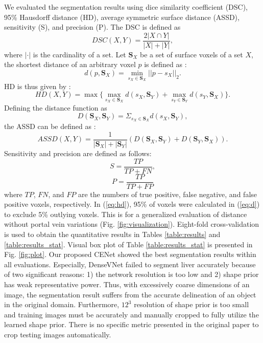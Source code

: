 \documentclass[journal]{IEEEtran}
\begin{document}
We evaluated the segmentation results using dice similarity coefficient (DSC), 95\% Hausdorff distance (HD), average symmetric surface distance (ASSD), sensitivity (S), and precision (P). The DSC is defined as
\begin{equation}
    DSC(X,Y)=\frac{2|X \cap Y|}{|X|+|Y|},
\end{equation}
\noindent
where \(|\cdot|\) is the cardinality of a set. Let \(\textbf{S}_X\) be a set of surface voxels of a set \(X\), the shortest distance of an arbitrary voxel \(p\) is defined as \cite{heimann2009comparison}:
\begin{equation}
    d(p, \textbf{S}_X)=\min_{s_X \in \textbf{S}_X}{||p-s_X||}_2.
\label{eq:d}
\end{equation}
\noindent
HD is thus given by \cite{heimann2009comparison}:
\begin{equation}
    HD(X,Y)=\max\{\max_{s_X \in \textbf{S}_X}{d(s_X, \textbf{S}_Y)}+\max_{s_Y \in \textbf{S}_Y}{d(s_Y, \textbf{S}_X)}\}.
\label{eq:hd}
\end{equation}
\noindent
Defining the distance function as
\begin{equation}
    D(\textbf{S}_X, \textbf{S}_Y)=\Sigma_{s_X \in \textbf{S}_X} d(s_X, \textbf{S}_Y),
\end{equation}
the ASSD can be defined as \cite{heimann2009comparison}:
\begin{equation}
    ASSD(X,Y)=\frac{1}{|\textbf{S}_X|+|\textbf{S}_Y|}(D(\textbf{S}_X, \textbf{S}_Y)+D(\textbf{S}_Y, \textbf{S}_X)).
\end{equation}
Sensitivity and precision are defined as follows:
\begin{equation}
    S=\frac{TP}{TP+FN},
\label{eq:sensitivity}
\end{equation}
\begin{equation}
    P=\frac{TP}{TP+FP}
\label{eq:precision}
\end{equation}
\noindent
where \(TP\), \(FN\), and \(FP\) are the numbers of true positive, false negative, and false positive voxels, respectively. In (\ref{eq:hd}), 95\% of voxels were calculated in (\ref{eq:d}) to exclude 5\% outlying voxels. This is for a generalized evaluation of distance without portal vein variations (Fig. \ref{fig:visualization}). Eight-fold cross-validation is used to obtain the quantitative results in Tables \ref{table:results} and \ref{table:results_stat}. Visual box plot of Table \ref{table:results_stat} is presented in Fig. \ref{fig:plot}. Our proposed CENet showed the best segmentation results within all evaluations. Especially, DenseVNet failed to segment liver accurately because of two significant reasons: 1) the network resolution is too low and 2) shape prior has weak representative power. Thus, with excessively coarse dimensions of an image, the segmentation result suffers from the accurate delineation of an object in the original domain. Furthermore, \(12^3\) resolution of shape prior is too small and training images must be accurately and manually cropped to fully utilize the learned shape prior. There is no specific metric presented in the original paper \cite{gibson2018automatic} to crop testing images automatically.\par
\end{document}
